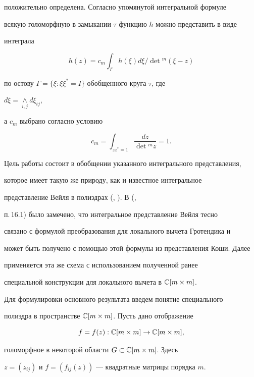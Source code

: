 положительно определена. Согласно упомянутой интегральной формуле 


всякую голоморфную в замыкании $\tau$ функцию $h$ можно представить в виде 


интеграла 


$$ 


h(z)=c_m\int_\Gamma h(\xi)d\xi/\det{}^m(\xi-z) 


$$ 


по остову $\Gamma=\{\xi:\xi\xi^*=I\}$ обобщенного круга $\tau$, где 


$d\xi=\underset{i,j}{\wedge}{}d\xi_{ij}$, 


а $c_m$ выбрано согласно условию 


$$ 


c_m=\int_{z z^*=1}\frac{d z}{\det{}^m z}=1. 


$$ 


 


Цель работы состоит в обобщении указанного интегрального представления, 


которое имеет такую же природу, как и известное интегральное 


представление Вейля в полиэдрах (\cite{2}, \cite{3}). В (\cite{3}, 


п.\,16.1) было замечено, что интегральное представление Вейля тесно 


связано с формулой преобразования для локального вычета Гротендика и 


может быть получено с помощью этой формулы из представления Коши. Далее 


применяется эта же схема с использованием полученной ранее \cite{4} 


специальной конструкции для локального вычета в $\Bbb C[m\times m]$. 


 


Для формулировки основного результата введем понятие специального 


полиэдра в пространстве $\Bbb C[m\times m]$. Пусть дано отображение 


\begin{equation} 


f=f(z):\Bbb C[m\times m]\to\Bbb C[m\times m], 


\end{equation} 


голоморфное в некоторой области $G\subset\Bbb C[m\times m]$. Здесь 


$z=(z_{i j})$ и $f=(f_{i j}(z))$ --- квадратные матрицы порядка $m$. 


